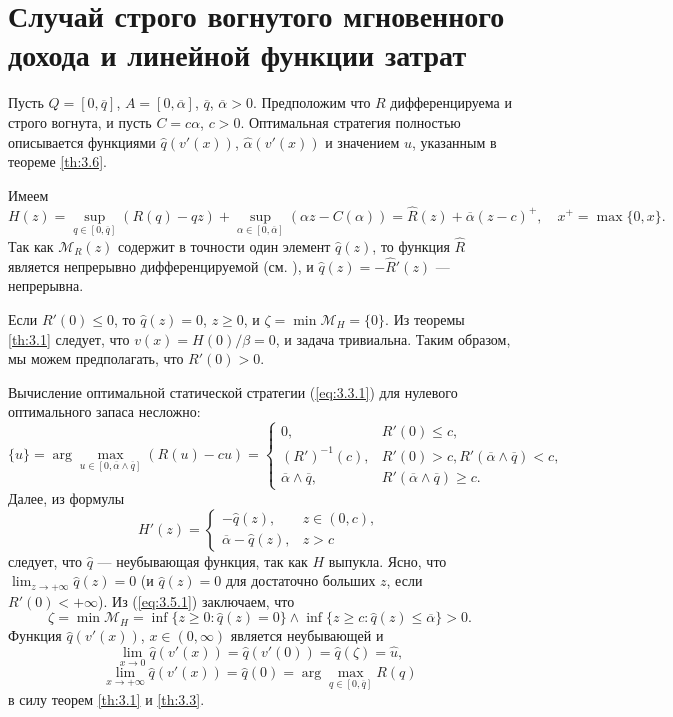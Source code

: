 \section{Случай строго вогнутого мгновенного дохода и линейной функции затрат}\label{sec:3.5}
Пусть $Q=[0,\overline q]$, $A=[0,\overline\alpha]$, $\overline q$, $\overline\alpha>0$. Предположим что $R$ дифференцируема и строго вогнута, и пусть $C=c\alpha$, $c>0$. Оптимальная стратегия полностью описывается функциями $\widehat q(v'(x))$, $\widehat\alpha(v'(x))$ и значением $\widehat u$, указанным в теореме \ref{th:3.6}.

Имеем
$$ H(z)=\sup_{q\in [0,\overline q]}(R(q)-qz)+\sup_{\alpha\in [0,\overline\alpha]}(\alpha z-C(\alpha))
=\widehat R(z)+\overline\alpha(z-c)^+,\quad x^+=\max\{0,x\}.$$
Так как $\mathscr M_R(z)$ содержит в точности один элемент $\widehat q(z)$, то функция $\widehat R$ является непрерывно дифференцируемой (см. \cite[теорема 25.5]{Roc70}), и $\widehat q(z)=-\widehat R'(z)$ --- непрерывна.

Если $R'(0)\le 0$, то $\widehat q(z)=0$, $z\ge 0$, и $\zeta=\min\mathscr M_H=\{0\}$. Из теоремы \ref{th:3.1} следует, что $v(x)=H(0)/\beta=0$, и задача тривиальна. Таким образом, мы можем предполагать, что $R'(0)>0$.


Вычисление оптимальной статической стратегии (\ref{eq:3.3.1}) для нулевого оптимального запаса несложно:
$$ \{\widehat u\}=\arg\max_{u\in [0,\overline\alpha\wedge\overline q]}(R(u)-cu)=\begin{cases}
0,& R'(0)\le c,\\
(R')^{-1}(c),& R'(0)>c, R'(\overline\alpha\wedge\overline q)<c,\\
\overline\alpha\wedge\overline q,& R'(\overline\alpha\wedge\overline q)\ge c.
\end{cases}$$
Далее, из формулы
\begin{equation} \label{eq:3.5.1}
 H'(z)=\begin{cases}
-\widehat q(z),& z\in (0,c),\\
\overline\alpha-\widehat q(z),& z>c
\end{cases}
\end{equation}
следует, что $\widehat q$ --- неубывающая функция, так как $H$ выпукла. Ясно, что $\lim_{z\to+\infty}\widehat q(z)=0$ (и $\widehat q(z)=0$ для достаточно больших $z$, если $R'(0)<+\infty$). Из (\ref{eq:3.5.1}) заключаем, что
$$ \zeta=\min\mathscr M_H=\inf\{z\ge 0:\widehat q(z)=0\}\wedge\inf\{z\ge c:\widehat q(z)\le\overline\alpha\}>0.$$
Функция $\widehat q(v'(x))$, $x\in (0,\infty)$ является неубывающей и
$$ \lim_{x\to 0}\widehat q(v'(x))=\widehat q(v'(0))=\widehat q(\zeta)=\widehat u,$$
$$ \lim_{x\to +\infty}\widehat q(v'(x))=\widehat q(0)=\arg\max_{q\in [0,\overline q]} R(q)$$
в силу теорем \ref{th:3.1} и \ref{th:3.3}.


